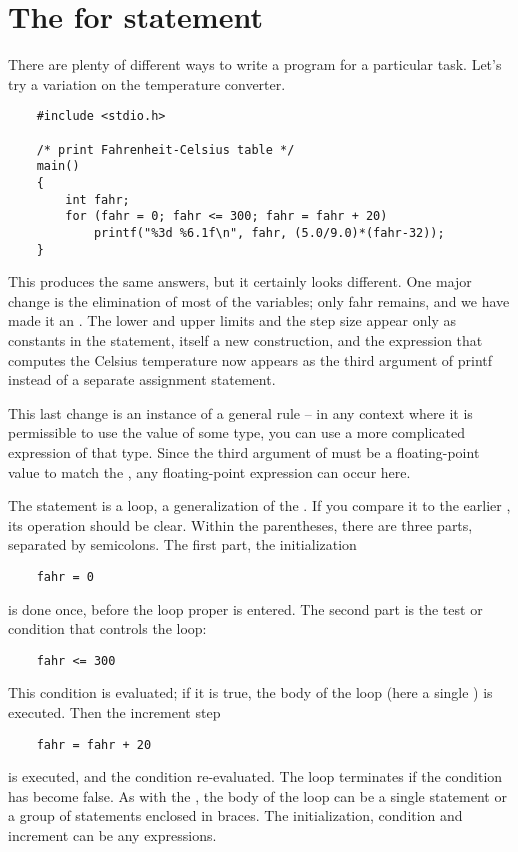 \section{The for statement}


There are plenty of different ways to write a program for a particular task. Let's try a variation on the temperature converter.
\begin{lstlisting}
	#include <stdio.h>

	/* print Fahrenheit-Celsius table */
	main()
	{
		int fahr;
		for (fahr = 0; fahr <= 300; fahr = fahr + 20)
			printf("%3d %6.1f\n", fahr, (5.0/9.0)*(fahr-32));
	}

\end{lstlisting}
This produces the same answers, but it certainly looks different.
One major change is the elimination of most of the variables; only fahr remains, and we have made it an .
The lower and upper limits and the step size appear only as constants in the  statement, itself a new construction, and the expression that computes the Celsius temperature now appears as the third argument of printf instead of a separate assignment statement.

This last change is an instance of a general rule -- in any context where it is permissible to use the value of some type, you can use a more complicated expression of that type.
Since the third argument of  must be a floating-point value to match the , any floating-point expression can occur here.

The  statement is a loop, a generalization of the .
If you compare it to the earlier , its operation should be clear.
Within the parentheses, there are three parts, separated by semicolons.
The first part, the initialization
\begin{lstlisting}
	fahr = 0
\end{lstlisting}
is done once, before the loop proper is entered. The second part is the test or condition that controls the loop:
\begin{lstlisting}
	fahr <= 300
\end{lstlisting}
This condition is evaluated; if it is true, the body of the loop (here a single ) is executed. Then the increment step
\begin{lstlisting}
	fahr = fahr + 20
\end{lstlisting}
is executed, and the condition re-evaluated.
The loop terminates if the condition has become false.
As with the , the body of the loop can be a single statement or a group of statements enclosed in braces.
The initialization, condition and increment can be any expressions.

